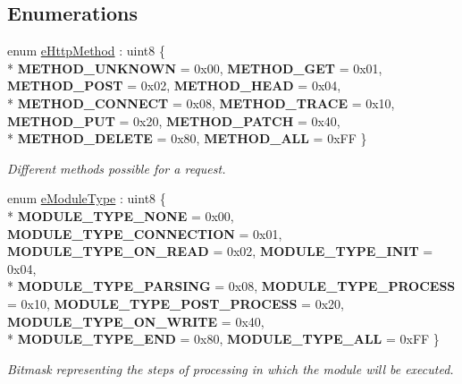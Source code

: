 \subsection*{Enumerations}
\begin{DoxyCompactItemize}
\item 
enum \hyperlink{namespace_a_p_i_kachu_aeff09045bb4c289dc6f23d46950d830e}{e\+Http\+Method} \+: uint8 \{ \\*
{\bfseries M\+E\+T\+H\+O\+D\+\_\+\+U\+N\+K\+N\+O\+WN} = 0x00, 
{\bfseries M\+E\+T\+H\+O\+D\+\_\+\+G\+ET} = 0x01, 
{\bfseries M\+E\+T\+H\+O\+D\+\_\+\+P\+O\+ST} = 0x02, 
{\bfseries M\+E\+T\+H\+O\+D\+\_\+\+H\+E\+AD} = 0x04, 
\\*
{\bfseries M\+E\+T\+H\+O\+D\+\_\+\+C\+O\+N\+N\+E\+CT} = 0x08, 
{\bfseries M\+E\+T\+H\+O\+D\+\_\+\+T\+R\+A\+CE} = 0x10, 
{\bfseries M\+E\+T\+H\+O\+D\+\_\+\+P\+UT} = 0x20, 
{\bfseries M\+E\+T\+H\+O\+D\+\_\+\+P\+A\+T\+CH} = 0x40, 
\\*
{\bfseries M\+E\+T\+H\+O\+D\+\_\+\+D\+E\+L\+E\+TE} = 0x80, 
{\bfseries M\+E\+T\+H\+O\+D\+\_\+\+A\+LL} = 0x\+FF
 \}\begin{DoxyCompactList}\small\item\em Different methods possible for a request. \end{DoxyCompactList}
\item 
enum \hyperlink{namespace_a_p_i_kachu_a114c3c51518a62812ae20c3554244347}{e\+Module\+Type} \+: uint8 \{ \\*
{\bfseries M\+O\+D\+U\+L\+E\+\_\+\+T\+Y\+P\+E\+\_\+\+N\+O\+NE} = 0x00, 
{\bfseries M\+O\+D\+U\+L\+E\+\_\+\+T\+Y\+P\+E\+\_\+\+C\+O\+N\+N\+E\+C\+T\+I\+ON} = 0x01, 
{\bfseries M\+O\+D\+U\+L\+E\+\_\+\+T\+Y\+P\+E\+\_\+\+O\+N\+\_\+\+R\+E\+AD} = 0x02, 
{\bfseries M\+O\+D\+U\+L\+E\+\_\+\+T\+Y\+P\+E\+\_\+\+I\+N\+IT} = 0x04, 
\\*
{\bfseries M\+O\+D\+U\+L\+E\+\_\+\+T\+Y\+P\+E\+\_\+\+P\+A\+R\+S\+I\+NG} = 0x08, 
{\bfseries M\+O\+D\+U\+L\+E\+\_\+\+T\+Y\+P\+E\+\_\+\+P\+R\+O\+C\+E\+SS} = 0x10, 
{\bfseries M\+O\+D\+U\+L\+E\+\_\+\+T\+Y\+P\+E\+\_\+\+P\+O\+S\+T\+\_\+\+P\+R\+O\+C\+E\+SS} = 0x20, 
{\bfseries M\+O\+D\+U\+L\+E\+\_\+\+T\+Y\+P\+E\+\_\+\+O\+N\+\_\+\+W\+R\+I\+TE} = 0x40, 
\\*
{\bfseries M\+O\+D\+U\+L\+E\+\_\+\+T\+Y\+P\+E\+\_\+\+E\+ND} = 0x80, 
{\bfseries M\+O\+D\+U\+L\+E\+\_\+\+T\+Y\+P\+E\+\_\+\+A\+LL} = 0x\+FF
 \}\begin{DoxyCompactList}\small\item\em Bitmask representing the steps of processing in which the module will be executed. \end{DoxyCompactList}

\end{DoxyCompactItemize}
